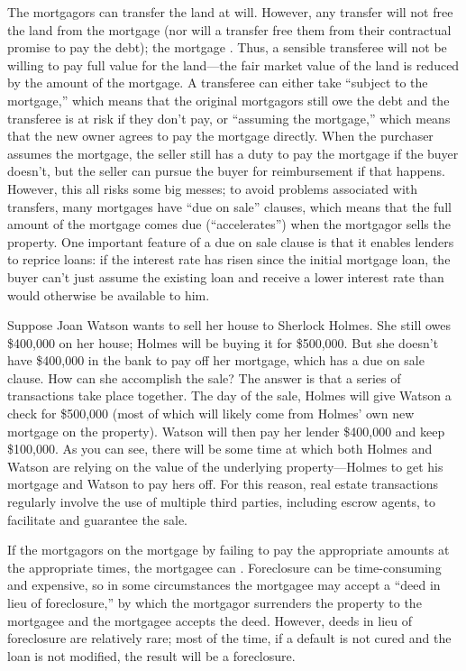 The mortgagors can transfer the land at will.  However, any transfer will not
free the land from the mortgage (nor will a transfer free them from their
contractual promise to pay the debt); the mortgage .
 Thus, a sensible transferee will not be willing to pay full value for the
land---the fair market value of the land is reduced by the amount of the
mortgage. A transferee can either take ``subject to the mortgage,'' which means
that the original mortgagors still owe the debt and the transferee is at risk if
they don't pay, or ``assuming the mortgage,'' which means that the new owner
agrees to pay the mortgage directly.  When the purchaser assumes the mortgage,
the seller still has a duty to pay the mortgage if the buyer doesn't, but the
seller can pursue the buyer for reimbursement if that happens.  However, this
all risks some big messes; to avoid problems associated with transfers, many
mortgages have ``due on sale'' clauses, which means that the full amount of the
mortgage comes due (``accelerates'') when the mortgagor sells the property. One
important feature of a due on sale clause is that it enables lenders to reprice
loans: if the interest rate has risen since the initial mortgage loan, the buyer
can't just assume the existing loan and receive a lower interest rate than would
otherwise be available to him.

Suppose Joan Watson wants to sell her house to Sherlock Holmes.  She still owes
\$400,000 on her house; Holmes will be buying it for \$500,000.  But she
doesn't have \$400,000 in the bank to pay off her mortgage, which has a due on
sale clause.  How can she accomplish the sale?  The answer is that a series of
transactions take place together.  The day of the sale, Holmes will give Watson
a check for \$500,000 (most of which will likely come from Holmes' own new
mortgage on the property).  Watson will then pay her lender \$400,000 and keep
\$100,000.  As you can see, there will be some time at which both Holmes and
Watson are relying on the value of the underlying property---Holmes to get his
mortgage and Watson to pay hers off.  For this reason, real estate transactions
regularly involve the use of multiple third parties, including escrow agents,
to facilitate and guarantee the sale.  

If the mortgagors  on the mortgage by failing to pay the
appropriate
amounts at the appropriate times, the mortgagee can
.  Foreclosure can
be time-consuming and expensive, so in some circumstances the mortgagee may
accept a ``deed in lieu of foreclosure,'' by which the mortgagor surrenders the
property to the mortgagee and the mortgagee accepts the deed.  However, deeds
in lieu of foreclosure are relatively rare; most of the time, if a default is
not cured and the loan is not modified, the result will be a foreclosure.  

